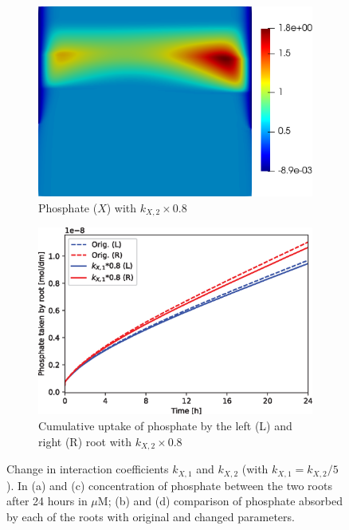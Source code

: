 \documentclass[11pt]{article}
\numberwithin{equation}{section}
\begin{document}
\begin{figure}[!htb]
\begin{subfigure}[t]{0.35\textwidth}
    \includegraphics[width=\textwidth]{Figures/X_kxdown20.png}
    \caption{Phosphate ($X$) with $k_{X,2}\times 0.8$}
    \label{fig:numexp_kdown1}
\end{subfigure}
\hspace{1cm}
\begin{subfigure}[t]{0.4\textwidth}
    \includegraphics[width=\textwidth]{Figures/kxdown20.eps}
    \caption{Cumulative uptake of phosphate by the left (L) and right (R) root with $k_{X,2}\times 0.8$}
    \label{fig:numexp_kdown2}
\end{subfigure}

\caption{Change in interaction coefficients $k_{X,1}$ and $k_{X,2}$ (with $k_{X,1} = k_{X,2}/5$). In (a) and (c) concentration of phosphate between the two roots after 24 hours in $\mu$M; (b) and (d) comparison of phosphate absorbed by each of the roots with original and changed parameters.}
\label{fig:numexp_F11w}
\end{figure}
\end{document}
